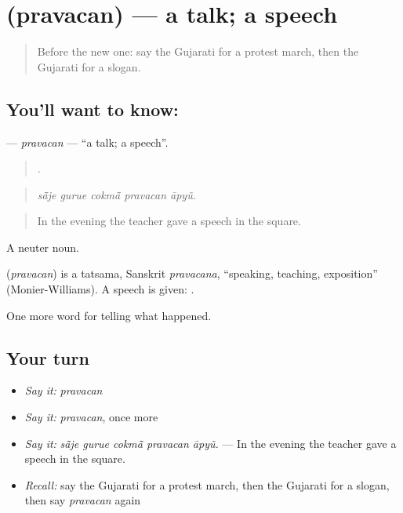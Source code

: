 \section[\texorpdfstring{\gu{પ્રવચન} (pravacan)}{પ્રવચન (pravacan)}]{ (pravacan) — a talk; a speech}

\label{lesson:GU-C314-pravacan}



\begin{quote}
Before the new one: say the Gujarati for a protest march, then the Gujarati for a slogan.
\end{quote}

\subsection*{You'll want to know: }
\textbf{} — \emph{pravacan} — \textquotedblleft{}a talk; a speech\textquotedblright{}.

\begin{quote}
    .
\end{quote}

\begin{quote}
\emph{sā̃je gurue cokmā̃ pravacan āpyũ.}
\end{quote}

\begin{quote}
In the evening the teacher gave a speech in the square.
\end{quote}

A neuter noun.

\begin{cousinweb}
\textbf{} (\emph{pravacan}) is a tatsama, Sanskrit \emph{pravacana}, \textquotedblleft{}speaking, teaching, exposition\textquotedblright{} (Monier-Williams). A speech is given: \textbf{ }.
\end{cousinweb}

\begin{grammarlens}[title={What you've built}]
One more word for telling what happened.
\end{grammarlens}

\subsection*{Your turn}
\begin{itemize}
\raggedright
  \item \emph{Say it:} \emph{pravacan}
  \item \emph{Say it:} \emph{pravacan}, once more
  \item \emph{Say it:} \emph{sā̃je gurue cokmā̃ pravacan āpyũ.} — In the evening the teacher gave a speech in the square.
  \item \emph{Recall:} say the Gujarati for a protest march, then the Gujarati for a slogan, then say \emph{pravacan} again
\end{itemize}


